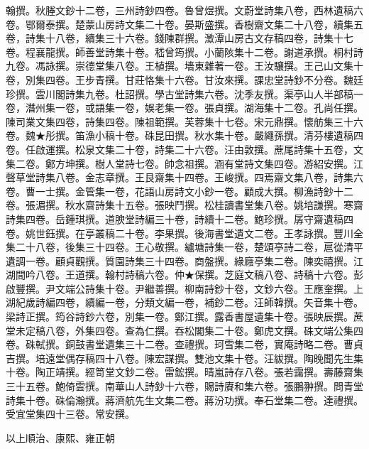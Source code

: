 \begin{pinyinscope}
翰撰。秋塍文鈔十二卷，三州詩鈔四卷。魯曾煜撰。文蔚堂詩集八卷，西林遺稿六卷。鄂爾泰撰。楚蒙山房詩文集二十卷。晏斯盛撰。香樹齋文集二十八卷，續集五卷，詩集十八卷，續集三十六卷。錢陳群撰。澂潭山房古文存稿四卷，詩集十七卷。程襄龍撰。師善堂詩集十卷。嵇曾筠撰。小蘭陔集十二卷。謝道承撰。桐村詩九卷。馮詠撰。崇德堂集八卷。王植撰。墻東雜著一卷。王汝驤撰。王己山文集十卷，別集四卷。王步青撰。甘莊恪集十六卷。甘汝來撰。課忠堂詩鈔不分卷。魏廷珍撰。雲川閣詩集九卷。杜詔撰。學古堂詩集六卷。沈季友撰。渠亭山人半部稿一卷，潛州集一卷，或語集一卷，娛老集一卷。張貞撰。湖海集十二卷。孔尚任撰。陳司業文集四卷，詩集四卷。陳祖範撰。芙蓉集十七卷。宋元鼎撰。懷舫集三十六卷。魏★彤撰。笛漁小稿十卷。硃昆田撰。秋水集十卷。嚴繩孫撰。清芬樓遺稿四卷。任啟運撰。松泉文集二十卷，詩集二十六卷。汪由敦撰。蔗尾詩集十五卷，文集二卷。鄭方坤撰。樹人堂詩七卷。帥念祖撰。涵有堂詩文集四卷。游紹安撰。江聲草堂詩集八卷。金志章撰。王艮齋集十四卷。王峻撰。四焉齋文集八卷，詩集六卷。曹一士撰。金管集一卷，花語山房詩文小鈔一卷。顧成大撰。柳漁詩鈔十二卷。張湄撰。秋水齋詩集十五卷。張映鬥撰。松桂讀書堂集八卷。姚培謙撰。寒齋詩集四卷。岳鍾琪撰。道腴堂詩編三十卷，詩續十二卷。鮑珍撰。孱守齋遺稿四卷。姚世鈺撰。在亭叢稿二十卷。李果撰。後海書堂遺文二卷。王孝詠撰。豐川全集二十八卷，後集三十四卷。王心敬撰。纑塘詩集一卷，楚頌亭詩二卷，扈從清平遺調一卷。顧貞觀撰。質園詩集三十四卷。商盤撰。綠廕亭集二卷。陳奕禧撰。江湖間吟八卷。王道撰。翰村詩稿六卷。仲★保撰。芝庭文稿八卷、詩稿十六卷。彭啟豐撰。尹文端公詩集十卷。尹繼善撰。柳南詩鈔十卷，文鈔六卷。王應奎撰。上湖紀歲詩編四卷，續編一卷，分類文編一卷，補鈔二卷。汪師韓撰。矢音集十卷。梁詩正撰。筠谷詩鈔六卷，別集一卷。鄭江撰。露香書屋遺集十卷。張映辰撰。蔗堂未定稿八卷，外集四卷。查為仁撰。吞松閣集二十卷。鄭虎文撰。硃文端公集四卷。硃軾撰。銅鼓書堂遺集三十二卷。查禮撰。珂雪集二卷，實庵詩略二卷。曹貞吉撰。培遠堂偶存稿四十八卷。陳宏謀撰。雙池文集十卷。汪紱撰。陶晚聞先生集十卷。陶正靖撰。經笥堂文鈔二卷。雷鋐撰。晴嵐詩存八卷。張若靄撰。壽藤齋集三十五卷。鮑倚雲撰。南華山人詩鈔十六卷，賜詩賡和集六卷。張鵬翀撰。問青堂詩集十卷。硃倫瀚撰。蔣濟航先生文集二卷。蔣汾功撰。奉石堂集二卷。達禮撰。受宜堂集四十三卷。常安撰。

以上順治、康熙、雍正朝


\end{pinyinscope}
